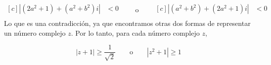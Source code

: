 \begin{problema}
\begin{sol}
            \begin{equation*}
                \begin{aligned}[c]
                    |(2a^2+1)+(a^2+b^2)i| &<0\\
                \end{aligned}
                \qquad\text{o}\qquad
                \begin{aligned}[c]
                    \left|(a^2+b^2)+(2a^2+1)i\right| &<0\\
                \end{aligned}
                \end{equation*}            
            Lo que es una contradicción, ya que encontramos otras dos formas de representar un número complejo $z$. Por lo tanto, para cada número complejo $z$, 

            $$|z+1| \geq \frac{1}{\sqrt{2}}\qquad \text{o} \qquad \left|z^{2}+1\right| \geq 1$$
    \end{sol}
\end{problema}

